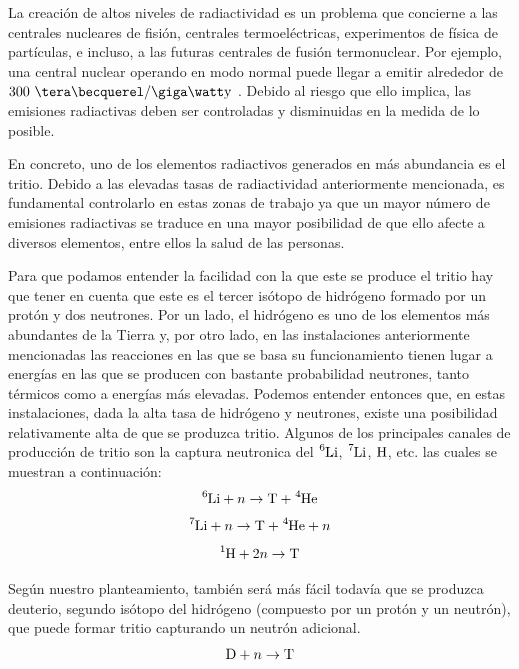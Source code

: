 La creación de altos niveles de radiactividad es un problema que concierne  a las  centrales nucleares de fisión, centrales termoeléctricas,  experimentos de física de partículas, e incluso, a las  futuras centrales de fusión termonuclear.  Por ejemplo, una central nuclear operando en modo normal puede llegar a emitir alrededor de $300\ \tera\becquerel/\giga\watt\mathrm{y}$ \cite{300TBq}.  Debido al riesgo que ello implica, las emisiones radiactivas deben ser controladas y disminuidas en la medida de lo posible.

En concreto, uno de los elementos radiactivos generados en más abundancia es el tritio. Debido a las elevadas tasas de radiactividad anteriormente mencionada, es fundamental controlarlo en estas zonas de trabajo ya que un mayor número de emisiones radiactivas se traduce en una mayor posibilidad de que ello afecte a diversos elementos, entre ellos la salud de las personas.

Para que podamos entender la facilidad con la que este se produce el tritio hay que tener en cuenta que este es el tercer isótopo de hidrógeno formado por un protón y dos neutrones. Por un lado, el hidrógeno es uno de los elementos más abundantes de la Tierra y, por otro lado, en las instalaciones anteriormente mencionadas  las reacciones en las que se basa su funcionamiento tienen lugar a energías  en las que se producen con bastante probabilidad neutrones, tanto térmicos como a energías más elevadas. 
Podemos entender entonces que, en estas instalaciones, dada la alta tasa de hidrógeno y neutrones, existe una posibilidad relativamente alta de que se produzca tritio. Algunos de los principales canales de producción de tritio son la captura neutronica del $\ce{^6Li}$, $\ce{^7Li}$, $\ce{H}$, etc. las cuales se muestran a continuación:
\begin{equation}
\ce{^{6}Li} + n \rightarrow \ce{T} + \ce{^{4}He}
\label{capneuLi6}
\end{equation}
\begin{equation}
\ce{^{7}Li} + n \rightarrow  \ce{T} + \ce{^{4}He} + n
\label{capneuLi7}
\end{equation}
\begin{equation}
\ce{^{1}H} + 2n \rightarrow  \ce{T}  
\label{capneuH}
\end{equation}

Según nuestro planteamiento, también será más fácil todavía que se produzca deuterio, segundo isótopo del hidrógeno (compuesto por un protón y un neutrón), que puede formar tritio capturando un neutrón adicional. 
\begin{equation}
\ce{D} + n \rightarrow  \ce{T}  
\label{capneuD}
\end{equation}


